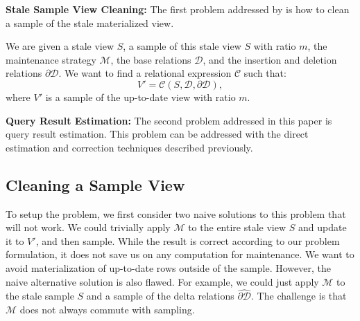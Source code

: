 \noindent\textbf{Stale Sample View Cleaning: }
The first problem addressed by \svc is how to clean a sample of the stale materialized view.
\begin{problem}\sloppy
We are given a stale view $S$, a sample of this stale view $S$ with ratio $m$, the maintenance strategy $\mathcal{M}$, the base relations $\mathcal{D}$, and
the insertion and deletion relations $\partial \mathcal{D}$.
We want to find a relational expression $\mathcal{C}$ such that:
\[
V' = \mathcal{C}(S,\mathcal{D},\partial \mathcal{D}),
\]
where $V'$ is a sample of the up-to-date view with ratio $m$. 
\end{problem}

\noindent\textbf{Query Result Estimation: }
The second problem addressed in this paper is query result estimation.
This problem can be addressed with the direct estimation and correction techniques 
described previously.

\subsection{Cleaning a Sample View}
To setup the problem, we first consider two naive solutions to this problem that will not work. 
We could trivially apply $\mathcal{M}$ to the entire stale view $S$ and update it to $V'$, and then sample.
While the result is correct according to our problem formulation, it does not save us on any computation for maintenance.
We want to avoid materialization of up-to-date rows outside of the sample. 
However, the naive alternative solution is also flawed. 
For example, we could just apply $\mathcal{M}$ to the stale sample $S$ and a sample of the delta relations $\widehat{\partial \mathcal{D}}$. 
The challenge is that $\mathcal{M}$ does not always commute with sampling.

\vspace{0.5em} 

